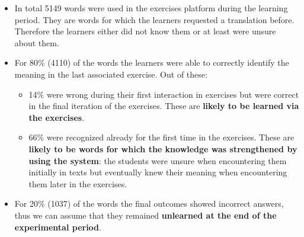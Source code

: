   \begin{itemize}
    \item In total 5149 words were used in the exercises platform during the learning period. They are words for which the learners requested a translation before. Therefore the learners either did not know them or at least were unsure about them.

    \item For 80\% (4110) of the words the learners were able to correctly identify the meaning in the last associated exercise. Out of these: 

    \begin{itemize}
      \item 14\% were wrong during their first interaction in exercises but were correct in the final iteration of the exercises. These are {\bf likely to be learned via the exercises}.

      \item 66\% were recognized already for the first time in the exercises. These are {\bf likely to be words for which the knowledge was strengthened by using the system}: the students were unsure when encountering them initially in texts but eventually knew their meaning when encountering them later in the exercises. 
    \end{itemize}

    \item For 20\% (1037) of the words the final outcomes showed incorrect answers, thus we can assume that they remained {\bf unlearned at the end of the experimental period}.

  \end{itemize}










